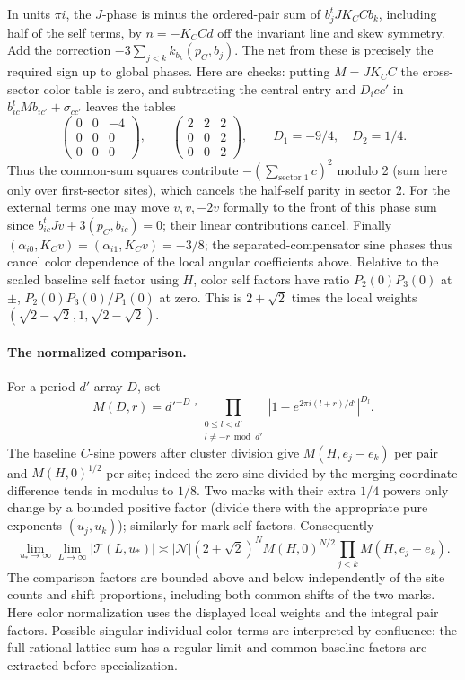 In units \(\pi i\), the \(J\)-phase is minus the ordered-pair sum of \(b_j^t J K_C C b_k\), including half of the self terms, by \(n=-K_C C d\) off the invariant line and skew symmetry. Add the correction \(-3\sum_{j<k} k_{b_k}(p_C,b_j)\). The net from these is precisely the required sign up to global phases. Here are checks: putting \(M=JK_CC\) the cross-sector color table is zero, and subtracting the central entry and \(D_i c c'\) in \(b_{ic}^t M b_{ic'}+\sigma_{cc'}\) leaves the tables
\[
 \begin{pmatrix}0&0&-4\\0&0&0\\0&0&0\end{pmatrix},\qquad
 \begin{pmatrix}2&2&2\\0&0&2\\0&0&2\end{pmatrix},\qquad D_1=-9/4,\quad D_2=1/4.
\]
Thus the common-sum squares contribute \(-(\sum_{\text{sector }1} c)^2\) modulo 2 (sum here only over first-sector sites), which cancels the half-self parity in sector 2. For the external terms one may move \(v,v,-2v\) formally to the front of this phase sum since \(b_{ic}^t J v+3(p_C,b_{ic})=0\); their linear contributions cancel. Finally \((\alpha_{i0},K_Cv)=(\alpha_{i1},K_Cv)=-3/8\); the separated-compensator sine phases thus cancel color dependence of the local angular coefficients above. Relative to the scaled baseline self factor using \(H\), color self factors have ratio \(P_2(0)P_3(0)\) at \(\pm\), \(P_2(0)P_3(0)/P_1(0)\) at zero. This is \(2+\sqrt2\) times the local weights \((\sqrt{2-\sqrt2},1,\sqrt{2-\sqrt2})\).

\paragraph{The normalized comparison.} For a period-\(d'\) array \(D\), set
\[
 M(D,r)= d'^{-D_{-r}}
    \prod_{\substack{0\le l<d'\\l\ne-r\bmod d'}}|1-e^{2\pi i(l+r)/d'}|^{D_l}.
\]
The baseline \(C\)-sine powers after cluster division give \(M(H,e_j-e_k)\) per pair and \(M(H,0)^{1/2}\) per site; indeed the zero sine divided by the merging coordinate difference tends in modulus to \(1/8\). Two marks with their extra \(1/4\) powers only change by a bounded positive factor (divide there with the appropriate pure exponents \((u_j,u_k)\)); similarly for mark self factors. Consequently
\begin{equation}\label{c4:confluent-color-scale}
 \lim_{u_*\to\infty}\lim_{L\to\infty}|\mathcal T(L,u_*)|
 \asymp |\mathscr N|(2+\sqrt2)^N M(H,0)^{N/2}
                  \prod_{j<k} M(H,e_j-e_k).
\end{equation}
The comparison factors are bounded above and below independently of
the site counts and shift proportions, including both common shifts of
the two marks.
Here color normalization uses the displayed local weights and the integral pair factors. Possible singular individual color terms are interpreted by confluence: the full rational lattice sum has a regular limit and common baseline factors are extracted before specialization.

